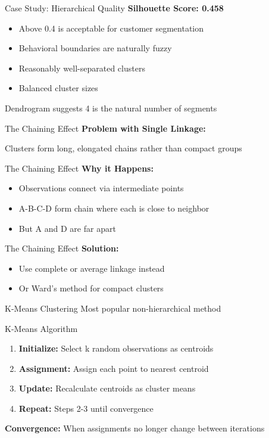 \documentclass[aspectratio=169,ignorenonframetext]{beamer}
\begin{document}
\begin{frame}{Case Study: Hierarchical Quality}
\textbf{Silhouette Score: 0.458}

\begin{itemize}
\item
  Above 0.4 is acceptable for customer segmentation
\item
  Behavioral boundaries are naturally fuzzy
\item
  Reasonably well-separated clusters
\item
  Balanced cluster sizes
\end{itemize}

Dendrogram suggests 4 is the natural number of segments
\end{frame}

\begin{frame}{The Chaining Effect}
\textbf{Problem with Single Linkage:}

Clusters form long, elongated chains rather than compact groups
\end{frame}

\begin{frame}{The Chaining Effect}
\textbf{Why it Happens:}

\begin{itemize}
\item
  Observations connect via intermediate points
\item
  A-B-C-D form chain where each is close to neighbor
\item
  But A and D are far apart
\end{itemize}
\end{frame}

\begin{frame}{The Chaining Effect}
\textbf{Solution:}

\begin{itemize}
\item
  Use complete or average linkage instead
\item
  Or Ward's method for compact clusters
\end{itemize}
\end{frame}

\begin{frame}{K-Means Clustering}
Most popular non-hierarchical method
\end{frame}

\begin{frame}{K-Means Algorithm}
\begin{enumerate}
\item
  \textbf{Initialize:} Select k random observations as centroids
\item
  \textbf{Assignment:} Assign each point to nearest centroid
\item
  \textbf{Update:} Recalculate centroids as cluster means
\item
  \textbf{Repeat:} Steps 2-3 until convergence
\end{enumerate}

\textbf{Convergence:} When assignments no longer change between
iterations
\end{frame}
\end{document}
